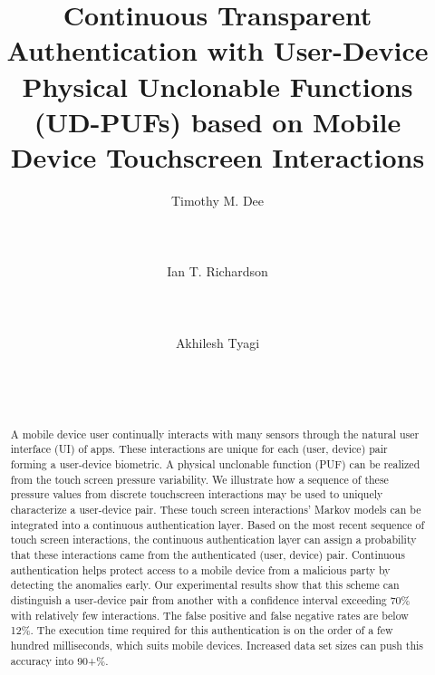 \documentclass{acm_proc_article-sp}
\title{Continuous Transparent Authentication with User-Device Physical Unclonable Functions (UD-PUFs) based on Mobile Device Touchscreen Interactions}
\author{
\alignauthor Timothy M. Dee\\
      \affaddr{Electrical \& Computer Engineering}\\
      \affaddr{Iowa State University}\\
      \affaddr{Ames, IA, USA}\\
      \email{timdee@iastate.edu}
\alignauthor Ian T. Richardson\\
     \affaddr{Electrical \& Computer Engineering}\\
     \affaddr{Iowa State University}\\
     \affaddr{Ames, IA, USA}\\
     \email{ian.t.rich@gmail.com}
\alignauthor Akhilesh Tyagi\\
     \affaddr{Electrical \& Computer Engineering}\\
     \affaddr{Iowa State University}\\
      \affaddr{Ames, IA, USA}\\
      \email{tyagi@iastate.edu}
}
\begin{document}
\maketitle
\begin{abstract}
A mobile device user continually interacts with many sensors through the natural
user interface (UI) of apps. 
These interactions are unique for each (user, device) pair
forming a user-device biometric.  
%
A physical unclonable function (PUF) can be realized
from the touch screen pressure variability.
%
We illustrate how a sequence of these pressure values 
from discrete touchscreen interactions 
may be used to uniquely characterize a user-device pair.
%
These touch screen interactions' Markov models can be integrated into a
continuous authentication layer.
%
Based on the most recent sequence of touch screen interactions,
the continuous authentication layer can assign a probability that these
interactions came from the authenticated (user, device) pair.
%
Continuous authentication helps protect access to a mobile device
from a malicious party by detecting the anomalies early.
%
Our experimental results show that this scheme can distinguish a user-device
pair from another with a confidence interval exceeding 70\%
with relatively few interactions. 
The false positive and false negative rates are below 12\%.
%
The execution time required for this authentication is 
on the order of a few hundred milliseconds, which suits mobile devices.
%
Increased data set sizes can push this accuracy into 90+\%.
\end{abstract}



\end{document}
